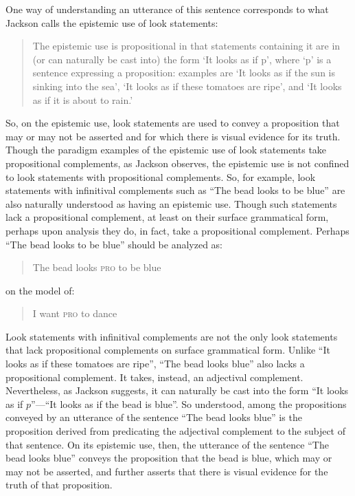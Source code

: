 \documentclass[12pt]{article}
\begin{document}
One way of understanding an utterance of this sentence corresponds to what Jackson calls the epistemic use of look statements:
	\begin{quote}
		The epistemic use is propositional in that statements containing it are in (or can naturally be cast into) the form `It looks as if p', where `p' is a sentence expressing a proposition: examples are `It looks as if the sun is sinking into the sea', `It looks as if these tomatoes are ripe', and `It looks as if it is about to rain.' \citep[30]{Jackson:1977fk}
	\end{quote}
So, on the epistemic use, look statements are used to convey a proposition that may or may not be asserted and for which there is visual evidence for its truth. Though the paradigm examples of the epistemic use of look statements take propositional complements, as Jackson observes, the epistemic use is not confined to look statements with propositional complements. So, for example, look statements with infinitival complements such as ``The bead looks to be blue'' are also naturally understood as having an epistemic use. Though such statements lack a propositional complement, at least on their surface grammatical form, perhaps upon analysis they do, in fact, take a propositional complement. Perhaps ``The bead looks to be blue'' should be analyzed as:
	\begin{quote}
		The bead looks \textsc{pro} to be blue
	\end{quote}
on the model of:
	\begin{quote}
		I want \textsc{pro} to dance
	\end{quote}
Look statements with infinitival complements are not the only look statements that lack propositional complements on surface grammatical form. Unlike ``It looks as if these tomatoes are ripe'', ``The bead looks blue'' also lacks a propositional complement. It takes, instead, an adjectival complement. Nevertheless, as Jackson suggests, it can naturally be cast into the form ``It looks as if \( p \)''---``It looks as if the bead is blue''. So understood, among the propositions conveyed by an utterance of the sentence ``The bead looks blue'' is the proposition derived from predicating the adjectival complement to the subject of that sentence. On its epistemic use, then, the utterance of the sentence ``The bead looks blue'' conveys the proposition that the bead is blue, which may or may not be asserted, and further asserts that there is visual evidence for the truth of that proposition. 
\end{document}
